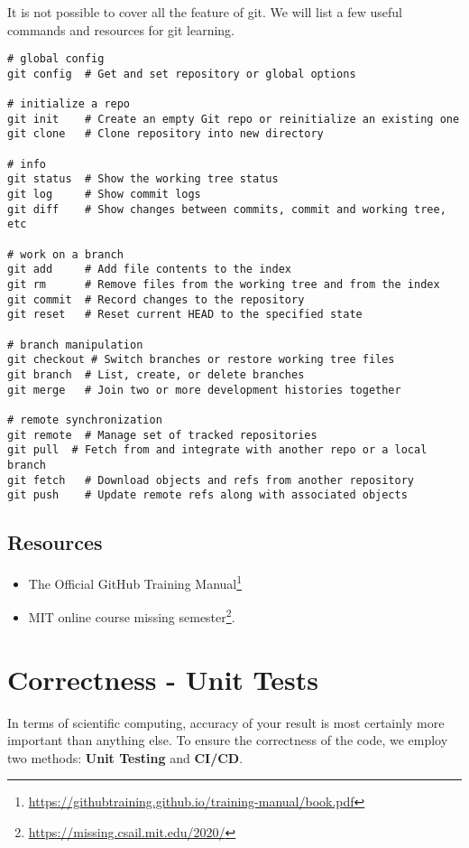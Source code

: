 \documentclass[
  notoc %
]{tufte-book}
\DeclareRobustCommand{\href}[2]{#2\footnote{\url{#1}}}
\providecommand{\tightlist}{%
  \setlength{\itemsep}{0pt}\setlength{\parskip}{0pt}
}
\begin{document}
It is not possible to cover all the feature of git. We will list a few
useful commands and resources for git learning.

\begin{lstlisting}
# global config
git config  # Get and set repository or global options

# initialize a repo
git init    # Create an empty Git repo or reinitialize an existing one
git clone   # Clone repository into new directory

# info
git status  # Show the working tree status
git log     # Show commit logs
git diff    # Show changes between commits, commit and working tree, etc

# work on a branch
git add     # Add file contents to the index
git rm      # Remove files from the working tree and from the index
git commit  # Record changes to the repository
git reset   # Reset current HEAD to the specified state

# branch manipulation
git checkout # Switch branches or restore working tree files
git branch  # List, create, or delete branches
git merge   # Join two or more development histories together

# remote synchronization
git remote  # Manage set of tracked repositories
git pull  # Fetch from and integrate with another repo or a local branch
git fetch   # Download objects and refs from another repository
git push    # Update remote refs along with associated objects
\end{lstlisting}

\hypertarget{resources}{%
\subsection{Resources}\label{resources}}

\begin{itemize}
\tightlist
\item
  \href{https://githubtraining.github.io/training-manual/book.pdf}{The
  Official GitHub Training Manual}
\item
  MIT online course \href{https://missing.csail.mit.edu/2020/}{missing
  semester}.
\end{itemize}

\hypertarget{sec:ci-cd}{%
\section{Correctness - Unit Tests}\label{sec:ci-cd}}

In terms of scientific computing, accuracy of your result is most
certainly more important than anything else. To ensure the correctness
of the code, we employ two methods: \textbf{Unit Testing} and
\textbf{CI/CD}.
\end{document}
